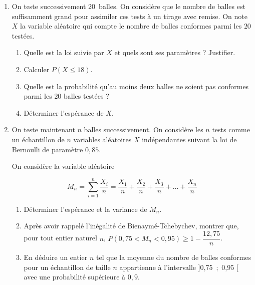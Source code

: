 \begin{enumerate}
\item On teste successivement $20$~balles. On considère que le nombre de balles est suffisamment grand pour assimiler ces tests à un tirage avec remise. On note $X$ la variable aléatoire qui compte le nombre de balles conformes parmi les $20$ testées.
	\begin{enumerate}
		\item Quelle est la loi suivie par $X$ et quels sont ses paramètres ? Justifier.
		\item Calculer $P(X \leqslant 18)$.
		\item Quelle est la probabilité qu'au moins deux balles ne soient pas conformes parmi les $20$ balles testées ?
		\item Déterminer l'espérance de $X$.
	\end{enumerate}
\item On teste maintenant $n$ balles successivement. On considère les $n$ tests comme un échantillon
de $n$ variables aléatoires $X$ indépendantes suivant la loi de Bernoulli de paramètre $0,85$.
	
On considère la variable aléatoire
	
\[M_n = \displaystyle\sum_{i=1}^n \dfrac{X_i}{n} = \dfrac{X_1}{n} + \dfrac{X_2}{n} + \dfrac{X_3}{n} + \ldots + \dfrac{X_n}{n}\]

	\begin{enumerate}
		\item Déterminer l'espérance et la variance de $M_n$.
		\item Après avoir rappelé l'inégalité de Bienaymé-Tchebychev, montrer que, pour tout entier naturel $n$,\: $P(0,75 < M_n < 0,95) \geqslant  1 - \dfrac{12,75}{n}$.
		\item En déduire un entier $n$ tel que la moyenne du nombre de balles conformes pour un échantillon de taille $n$ appartienne à l'intervalle ]0,75~;~0,95 [ avec une probabilité
supérieure à $0,9$.
	\end{enumerate}
\end{enumerate}

\vspace{0,5cm}
